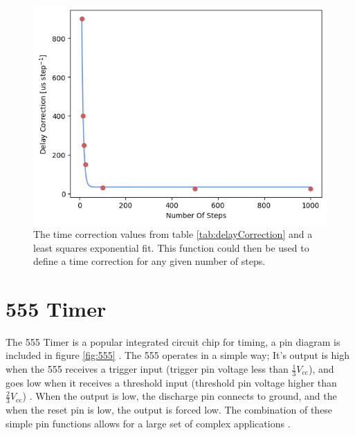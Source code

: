 \documentclass[%
 reprint,
 amsmath,amssymb,
 aps,
]{revtex4-2}
\begin{document}
        \begin{figure}
            \includegraphics[width=0.9\columnwidth]{Images/delayCorrection.png}
            \caption{\label{fig:delayCorrection}The time correction values from table \ref{tab:delayCorrection} and a least squares exponential fit. This function could then be used to define a time correction for any given number of steps.}
        \end{figure}

\section{555 Timer}
The 555 Timer is a popular integrated circuit chip for timing, a pin diagram is included in figure \ref{fig:555} \cite{horowitz}. The 555 operates in a simple way; It's output is high when the 555 receives a trigger input (trigger pin voltage less than $\frac{1}{3}V_{\text{cc}}$), and goes low when it receives a threshold input (threshold pin voltage higher than $\frac{2}{3}V_\text{cc}$) \cite{horowitz}. When the output is low, the discharge pin connects to ground, and the when the reset pin is low, the output is forced low. The combination of these simple pin functions allows for a large set of complex applications \cite{horowitz}.
\end{document}
